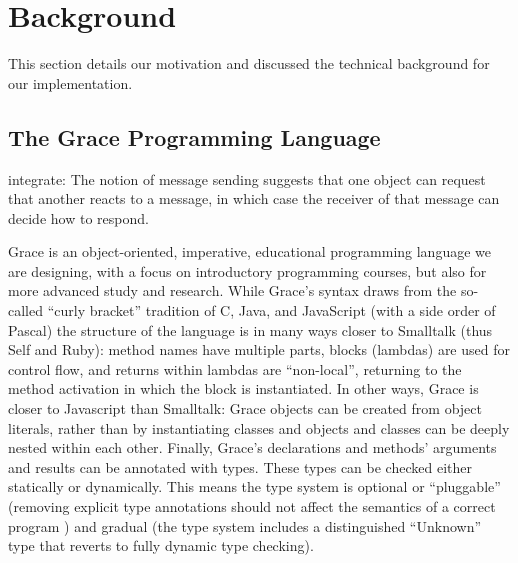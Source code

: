 
\section{Background}
\label{sec:background}

This section details our motivation and
discussed the technical background for our implementation.


%
%

\subsection{The Grace Programming Language}
\label{ssec:grace}


\begin{cnote}
  integrate:
  The notion of message sending suggests that one object can request that another reacts to a message,
  in which case the receiver of that message can decide how to respond.
\end{cnote}

Grace is an object-oriented, imperative, educational programming
language we are designing, with a focus on introductory programming
courses, but also for more advanced study
and research\citep{graceOnward12,graceSigcse13}.
While Grace's syntax draws
from the so-called ``curly bracket'' tradition of C, Java, and
JavaScript (with a side order of Pascal) the structure of the language
is in many ways closer to Smalltalk (thus Self and Ruby): method names
have multiple parts, blocks (lambdas) are used for control flow, and
returns within lambdas are ``non-local'', returning to the method
activation in which the block is instantiated\citep{bluebook}.  In
other ways, Grace is closer to Javascript than Smalltalk: Grace
objects can be created from object literals, rather than by
instantiating classes\citep{Black2007-emeraldHOPL,JonesECOOP2016} and
objects and classes can be deeply nested within each 
other\citep{betabook}.  Finally, Grace's declarations and methods' arguments
and results can be annotated with types.  These types can be checked
either statically or dynamically. This means the type system is
optional or ``pluggable'' \citep{GiladPluggable2004} (removing explicit
type annotations should not affect the semantics of a correct
program \citep{Siek2015}) and gradual (the type system
includes a distinguished ``Unknown'' type that reverts to fully 
dynamic type checking).

